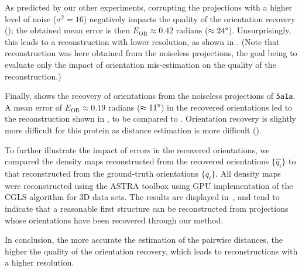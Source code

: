 As predicted by our other experiments, corrupting the projections with a higher level of noise ($\sigma^2=16$) negatively impacts the quality of the orientation recovery (); the obtained mean error is then $E_\text{OR} \approx 0.42$ radians ($\approx 24\degree$).
Unsurprisingly, this leads to a reconstruction with lower resolution, as shown in . (Note that reconstruction was here obtained from the noiseless projections, the goal being to evaluate only the impact of orientation mis-estimation on the quality of the reconstruction.)

Finally,  shows the recovery of orientations from the noiseless projections of \texttt{5a1a}.
A mean error of $E_\text{OR} \approx 0.19$ radians ($\approx 11\degree$) in the recovered orientations led to the reconstruction shown in , to be compared to .
Orientation recovery is slightly more difficult for this protein as distance estimation is more difficult ().

To further illustrate the impact of errors in the recovered orientations, we compared the density maps reconstructed from the recovered orientations $\{ \widehat{q_i} \}$ to that reconstructed from the ground-truth orientations $\{ q_i \}$. All density maps were reconstructed using the ASTRA toolbox using GPU implementation of the CGLS algorithm for 3D data sets. 
The results are displayed in~, and tend to indicate that a reasonable first structure can be reconstructed from projections whose orientations have been recovered through our method. 

In conclusion, the more accurate the estimation of the pairwise distances, the higher the quality of the orientation recovery, which leads to reconstructions with a higher resolution. %

